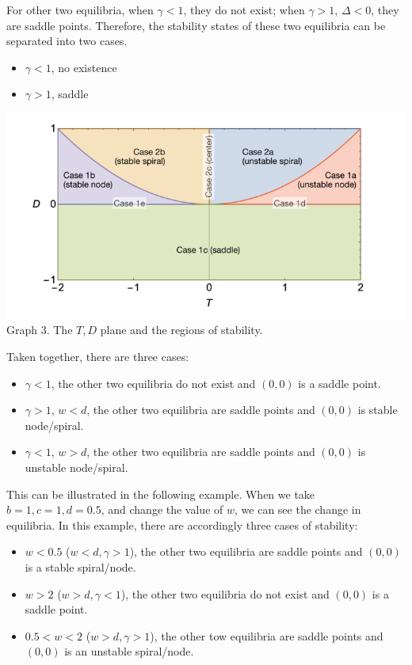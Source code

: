 \documentclass[12pt]{article}
\begin{document}
\indent For other two equilibria, when $\gamma<1$, they do not exist; when $\gamma>1$, $\Delta<0$, they are saddle points. Therefore, the stability states of these two equilibria can be separated into two cases. 
\begin{itemize}
  \item $\gamma<1$, no existence
  \item $\gamma>1$, saddle
\end{itemize}
\begin{center}
  \includegraphics[scale=0.5]{ StabilityExplanation.png}
  \\
  \footnotesize{Graph 3. The $T,D$ plane and the regions of stability.}
\end{center}

  Taken together, there are three cases:
  \begin{itemize}
    \item $\gamma<1$, the other two equilibria do not exist and $(0,0)$ is a saddle point.
    \item $\gamma>1$, $w<d$, the other two equilibria are saddle points and $(0,0)$ is stable node/spiral.
    \item $\gamma<1$, $w>d$, the other two equilibria are saddle points and $(0,0)$ is unstable node/spiral.
  \end{itemize}


  This can be illustrated in the following example. When we take $b=1,c=1,d=0.5$, and change the value of $w$, we can see the change in equilibria. In this example, there are accordingly three cases of stability:
  \begin{itemize}
    \item $w<0.5$ ($w<d,\gamma>1$), the other two equilibria are saddle points and $(0,0)$ is a stable spiral/node.
    \item $w>2$ ($w>d,\gamma<1$), the other two equilibria do not exist and $(0,0)$ is a saddle point.
    \item $0.5<w<2$ ($w>d,\gamma>1$), the other tow equilibria are saddle points and $(0,0)$ is an unstable spiral/node. 
  \end{itemize}
\end{document}
